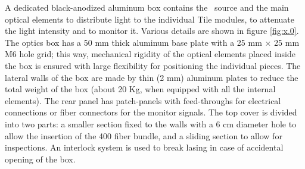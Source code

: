 A dedicated black-anodized aluminum box contains the \laser~source and the main optical
elements to distribute light to the individual Tile modules, to attenuate the light
intensity and to monitor it. Various details are shown in figure \ref{fig:x.0}. The
optics box has a 50 mm thick aluminum base plate with a 25 mm $\times$ 25 mm M6 hole
grid; this way, mechanical rigidity of the optical elements 
placed inside the box is ensured with large flexibility for positioning the
individual pieces. The lateral walls of the box are made by thin (2 mm) aluminum
plates to
reduce the total weight of the box (about 20 Kg, when equipped with all the internal
elements). The rear panel has patch-panels with feed-throughs for electrical
connections or fiber connectors for the monitor signals. The top cover is divided
into two parts: a smaller section fixed to the walls with a 6 cm diameter hole to
allow the insertion of the 400 fiber bundle, and a sliding section to allow for
inspections.  An interlock system is used to break lasing in case of accidental
opening of the box. 
